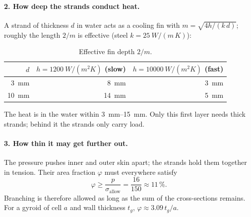 \documentclass[10pt,a4paper]{article}
\begin{document}
\paragraph{2. How deep the strands conduct heat.} A strand of thickness $d$ in water acts as a cooling fin with
$m = \sqrt{4h/(k\,d)}$; roughly the length $2/m$ is effective (steel $k = \SI{25}{W/(m\,K)}$):
\begin{table}[H]\centering\small
\begin{tabular}{rrr}\toprule
$d$ & $h = \SI{1200}{W/(m^2K)}$ (slow) & $h = \SI{10000}{W/(m^2K)}$ (fast)\\\midrule
\SI{3}{mm} & \SI{8}{mm} & \SI{3}{mm}\\
\SI{10}{mm} & \SI{14}{mm} & \SI{5}{mm}\\\bottomrule
\end{tabular}\caption{Effective fin depth $2/m$.}\end{table}
The heat is in the water within \SIrange{3}{15}{mm}. Only this first layer needs thick strands; behind it the strands
only carry load.

\paragraph{3. How thin it may get further out.} The pressure pushes inner and outer skin apart; the strands hold them
together in tension. Their area fraction $\varphi$ must everywhere satisfy
\[ \varphi \ge \frac{p}{\sigma_\text{allow}} = \frac{16}{150} \approx 11\,\%. \]
Branching is therefore allowed as long as the sum of the cross-sections remains. For a gyroid of cell $a$ and wall
thickness $t_g$, $\varphi \approx 3.09\,t_g/a$.
\end{document}
